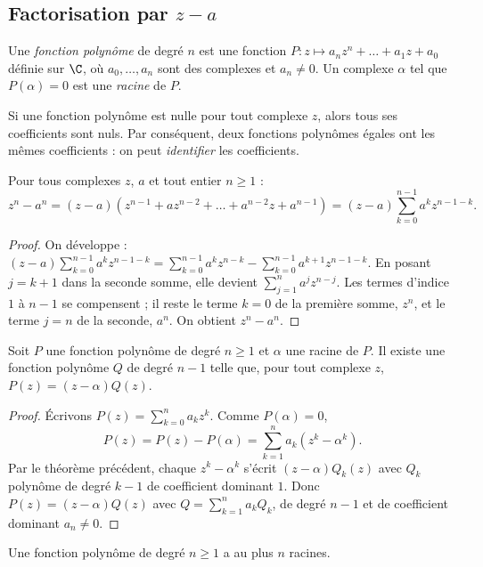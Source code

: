 \subsection{Factorisation par $z-a$}
\begin{definition}
Une \emph{fonction polynôme} de degré $n$ est une fonction $P:z\mapsto a_nz^n+\dots+a_1z+a_0$ définie sur $\C$, où $a_0,\dots,a_n$ sont des complexes et $a_n\neq0$. Un complexe $\alpha$ tel que $P(\alpha)=0$ est une \emph{racine} de $P$.
\end{definition}
\begin{keypoint}
Si une fonction polynôme est nulle pour tout complexe $z$, alors tous ses coefficients sont nuls. Par conséquent, deux fonctions polynômes égales ont les mêmes coefficients : on peut \emph{identifier} les coefficients.
\end{keypoint}
\begin{theorem}[Factorisation de $z^n-a^n$]
Pour tous complexes $z$, $a$ et tout entier $n\ge1$ :
\[z^n-a^n=(z-a)\left(z^{n-1}+az^{n-2}+\dots+a^{n-2}z+a^{n-1}\right)=(z-a)\sum_{k=0}^{n-1}a^kz^{n-1-k}.\]
\end{theorem}
\begin{proof}
On développe : $(z-a)\sum_{k=0}^{n-1}a^kz^{n-1-k}=\sum_{k=0}^{n-1}a^kz^{n-k}-\sum_{k=0}^{n-1}a^{k+1}z^{n-1-k}$. En posant $j=k+1$ dans la seconde somme, elle devient $\sum_{j=1}^{n}a^jz^{n-j}$. Les termes d'indice $1$ à $n-1$ se compensent ; il reste le terme $k=0$ de la première somme, $z^n$, et le terme $j=n$ de la seconde, $a^n$. On obtient $z^n-a^n$.
\end{proof}
\begin{theorem}
Soit $P$ une fonction polynôme de degré $n\ge1$ et $\alpha$ une racine de $P$. Il existe une fonction polynôme $Q$ de degré $n-1$ telle que, pour tout complexe $z$, $P(z)=(z-\alpha)Q(z)$.
\end{theorem}
\begin{proof}
Écrivons $P(z)=\sum_{k=0}^{n}a_kz^k$. Comme $P(\alpha)=0$,
\[P(z)=P(z)-P(\alpha)=\sum_{k=1}^{n}a_k\left(z^k-\alpha^k\right).\]
Par le théorème précédent, chaque $z^k-\alpha^k$ s'écrit $(z-\alpha)Q_k(z)$ avec $Q_k$ polynôme de degré $k-1$ de coefficient dominant $1$. Donc $P(z)=(z-\alpha)Q(z)$ avec $Q=\sum_{k=1}^na_kQ_k$, de degré $n-1$ et de coefficient dominant $a_n\neq0$.
\end{proof}
\begin{theorem}
Une fonction polynôme de degré $n\ge1$ a au plus $n$ racines.
\end{theorem}
